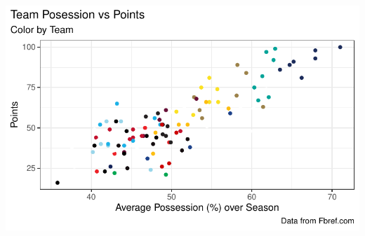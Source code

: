 \documentclass[
  letterpaper,
  DIV=11,
  numbers=noendperiod]{scrartcl}
\begin{document}
\includegraphics{project_part_3_files/figure-pdf/team-possession-plot-1.pdf}
\end{document}
